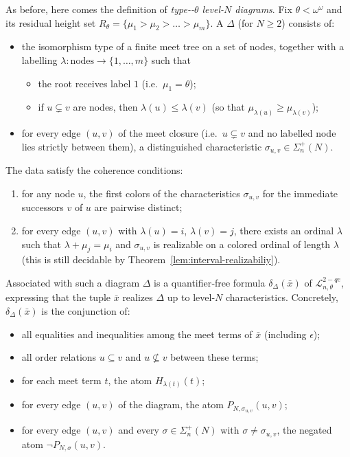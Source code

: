 \documentclass{amsart}
\theoremstyle{definition}
\begin{document}
As before, here comes the definition of \emph{type-{\MakeUppercase{}}-$\theta$ level-$N$ diagrams}. Fix $\theta<\omega^\omega$ and its residual height set $R_\theta=\{\mu_1>\mu_2>\dots>\mu_m\}$. A $\Delta$ (for $N\ge 2$) consists of:
\begin{itemize}
    \item the isomorphism type of a finite meet tree on a set of nodes, together with a labelling $\lambda\colon \text{nodes}\to\{1,\dots,m\}$ such that
    \begin{itemize}
        \item the root receives label $1$ (i.e.\ $\mu_1=\theta$);
        \item if $u\subsetneq v$ are nodes, then $\lambda(u)\leq\lambda(v)$ (so that $\mu_{\lambda(u)}\geq\mu_{\lambda(v)}$);
    \end{itemize}
    \item for every edge $(u,v)$ of the meet closure (i.e.\ $u\subsetneq v$ and no labelled node lies strictly between them), a distinguished characteristic $\sigma_{u,v}\in\Sigma_n^{+}(N)$.
\end{itemize}
The data satisfy the coherence conditions:
\begin{enumerate}
    \item[(i)] for any node $u$, the first colors of the characteristics $\sigma_{u,v}$ for the immediate successors $v$ of $u$ are pairwise distinct;
    \item[(ii)] for every edge $(u,v)$ with $\lambda(u)=i$, $\lambda(v)=j$, there exists an ordinal $\lambda$ such that $\lambda+\mu_j=\mu_i$ and $\sigma_{u,v}$ is realizable on a colored ordinal of length $\lambda$ (this is still decidable by Theorem~\ref{lem:interval-realizabiliy}).
\end{enumerate}
Associated with such a diagram $\Delta$ is a quantifier‑free formula $\delta_\Delta(\bar x)$ of $\mathcal L_{n,\theta}^{2-qe}$, expressing that the tuple $\bar x$ realizes $\Delta$ up to level‑$N$ characteristics.  Concretely, $\delta_\Delta(\bar x)$ is the conjunction of:
\begin{itemize}
    \item all equalities and inequalities among the meet terms of $\bar x$ (including $\epsilon$);
    \item all order relations $u\subseteq v$ and $u\not\subseteq v$ between these terms;
    \item for each meet term $t$, the atom $H_{\lambda(t)}(t)$;
    \item for every edge $(u,v)$ of the diagram, the atom $P_{N,\sigma_{u,v}}(u,v)$;
    \item for every edge $(u,v)$ and every $\sigma\in\Sigma_n^{+}(N)$ with $\sigma\neq\sigma_{u,v}$, the negated atom $\neg P_{N,\sigma}(u,v)$.
\end{itemize}
\end{document}
